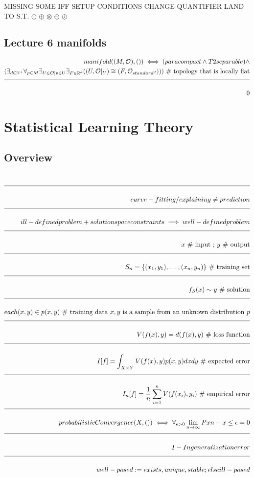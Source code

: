 \documentclass[a4paper]{article}
\newcommand{\eqComment}[1]{\text{  \# #1}}
\newcommand{\eqSep}{\text{ ;  }}
\newcommand{\n}{\\[1.5ex] \hline \nonumber \\[0ex]}
\newcommand{\m}{\nonumber \\}
\begin{document}
MISSING SOME IFF SETUP CONDITIONS
CHANGE QUANTIFIER LAND TO S.T.
$\odot$ \quad $\oplus$ \quad $\otimes$ \quad $\ominus$ \quad $\oslash$

\subsection{Lecture 6 manifolds}
\begin{tcolorbox}
\begin{align}
   manifold((M, \mathcal{O}), ()) \iff (paracompact \land T2separable) \land
\m (\exists_{d \in \mathbb{N}^+} \forall_{p \in M} \exists_{U \in \mathcal{O}| p \in U} \exists_{F \in \mathbb{R}^d} ((U, \mathcal{O}|_U) \cong (F, \mathcal{O}_{standard^d}))) \eqComment{topology that is locally flat}
\n 0
\end {align}
\end{tcolorbox}

\section{Statistical Learning Theory}
\subsection{Overview}
\begin{tcolorbox}
\begin{align}
\n curve-fitting / explaining \neq prediction
\n ill-defined problem + solution space constraints \implies well-defined problem
\n x \eqComment{input} \eqSep y \eqComment{output}
\n S_n = \{(x_1, y_1), \ldots, (x_n, y_n)\} \eqComment{training set}
\n f_S(x) \sim y \eqComment{solution}
\n each (x,y) \in p(x, y) \eqComment{training data $x, y$ is a sample from an unknown distribution $p$}
\n V(f(x), y) = d(f(x), y) \eqComment{loss function}
\n I[f] = \int_{X \times Y}{V(f(x), y) p(x, y) dx dy} \eqComment{expected error}
\n I_n[f] = \frac{1}{n} \sum_{i=1}^{n}{V(f(x_i), y_i)} \eqComment{empirical error}
\n probabilisticConvergence(X, ()) \iff \forall_{\epsilon > 0} \lim_{n \to \infty}{P{xn - x} \leq \epsilon} = 0
\n I - In generalization error
\n well-posed := exists, unique, stable ; else ill-posed
\end {align}
\end{tcolorbox}
\end{document}
